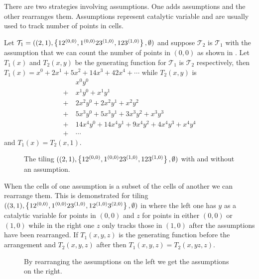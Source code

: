 There are two strategies involving assumptions. One adds assumptions and the other rearranges them. Assumptions represent catalytic variable and are usually used to track number of points in cells. 

Let $\mathcal{T}_1 = ((2,1),\left\{12^{(0,0)},1^{(0,0)}23^{(1,0)},123^{(1,0)}\right\},\emptyset)$ and suppose $\mathcal{T}_2$ is $\mathcal{T}_1$ with the assumption that we can count the number of points in $(0,0)$ as shown in . Let $T_1(x)$ and $T_2(x,y)$ be the generating function for $\mathcal{T}_1$ is $\mathcal{T}_2$ respectively, then $T_1(x) = x^0 + 2x^1 + 5x^2 + 14x^3 + 42x^4 + \dotsm$ while $T_2(x,y)$ is
\begin{align*}
    &\ x^0y^0\\
    + &\ x^1y^0 + x^1y^1\\
    + &\ 2x^2y^0 + 2x^2y^1 + x^2y^2\\
    + &\ 5x^3y^0 + 5x^3y^1 + 3x^3y^2 + x^3y^3\\
    + &\ 14x^4y^0 + 14x^4y^1 + 9x^4y^2 + 4x^4y^3 + x^4y^4\\
    + &\ \dotsm  
\end{align*}
and $T_1(x) = T_2(x,1)$.

\begin{figure}[ht!]
    \centering
    
    \caption{The tiling $((2,1),\left\{12^{(0,0)},1^{(0,0)}23^{(1,0)},123^{(1,0)}\right\},\emptyset)$ with and without an assumption.}
    \label{fig:addassumption}
\end{figure}

When the cells of one assumption is a subset of the cells of another we can rearrange them. This is demonstrated for tiling $((3,1),\left\{12^{(0,0)},1^{(0,0)}23^{(1,0)},12^{(1,0)}3^{(2,0)}\right\},\emptyset)$ in  where the left one has $y$ as a catalytic variable for points in $(0,0)$ and $z$ for points in either $(0,0)$ or $(1,0)$ while in the right one $z$ only tracks those in $(1,0)$ after the assumptions have been rearranged. If $T_1(x,y,z)$ is the generating function before the arrangement and $T_2(x,y,z)$ after then $T_1(x,y,z) = T_2(x,yz,z)$.

\begin{figure}[ht!]
    \centering
    
    \caption{By rearranging the assumptions on the left we get the assumptions on the right.}
    \label{fig:assrear}
\end{figure}